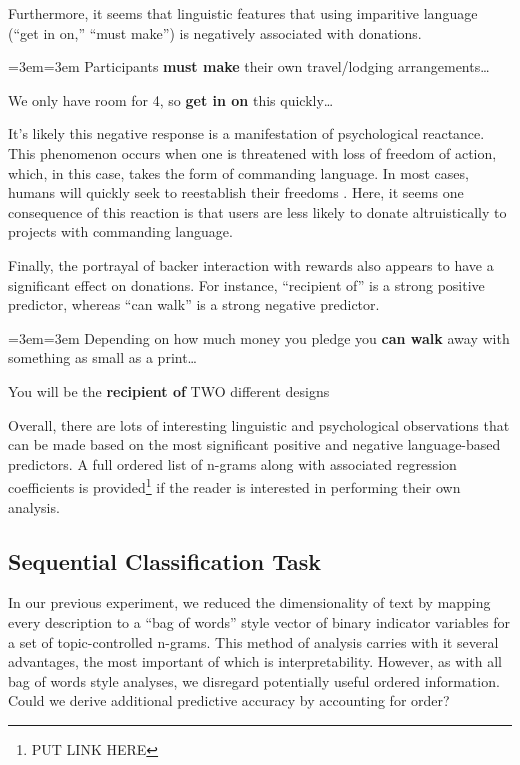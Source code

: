 \documentclass[letterpaper]{article}
\newenvironment{blockquote}{%
  \setlength{\parskip}{.5em}
  \par%
  \small
  \medskip
  \leftskip=3em\rightskip=3em%
  \noindent\ignorespaces}{%
  \par\medskip}
\begin{document}
Furthermore, it seems that linguistic features that using imparitive language (``get in on,'' ``must make'') is negatively associated with donations.
\begin{blockquote}
Participants \textbf{must make} their own travel/lodging arrangements\ldots\par\noindent
We only have room for 4, so \textbf{get in on} this quickly\ldots
\end{blockquote}
It's likely this negative response is a manifestation of psychological reactance. This phenomenon occurs when one is threatened with loss of freedom of action, which, in this case, takes the form of commanding language. In most cases, humans will quickly seek to reestablish their freedoms \cite{brehm1966theory}. Here, it seems one consequence of this reaction is that users are less likely to donate altruistically to projects with commanding language.

Finally, the portrayal of backer interaction with rewards also appears to have a significant effect on donations. For instance, ``recipient of'' is a strong positive predictor, whereas ``can walk'' is a strong negative predictor.
\begin{blockquote}
Depending on how much money you pledge you \textbf{can walk} away with something as small as a print\ldots\par\noindent
You will be the \textbf{recipient of} TWO different designs
\end{blockquote}
Overall, there are lots of interesting linguistic and psychological observations that can be made based on the most significant positive and negative language-based predictors. A full ordered list of n-grams along with associated regression coefficients is provided\footnote{PUT LINK HERE} if the reader is interested in performing their own analysis.

\subsection{Sequential Classification Task}
In our previous experiment, we reduced the dimensionality of text by mapping every description to a ``bag of words'' style vector of binary indicator variables for a set of topic-controlled n-grams. This method of analysis carries with it several advantages, the most important of which is interpretability. However, as with all bag of words style analyses, we disregard potentially useful ordered information. Could we derive additional predictive accuracy by accounting for order?
\end{document}
